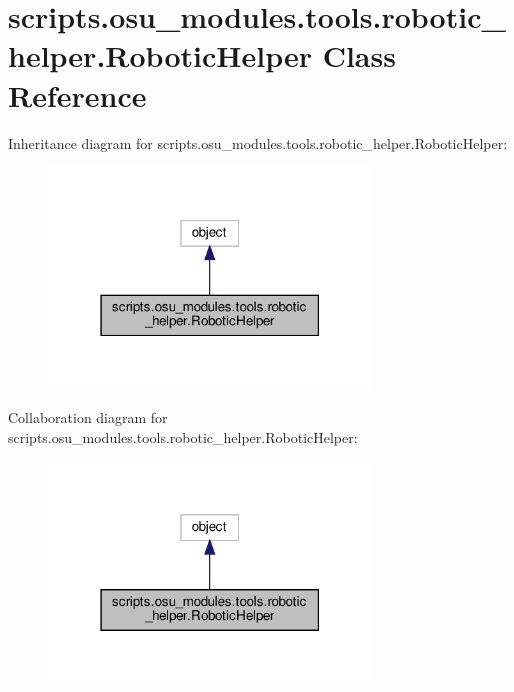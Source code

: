 \hypertarget{classscripts_1_1osu__modules_1_1tools_1_1robotic__helper_1_1RoboticHelper}{}\section{scripts.\+osu\+\_\+modules.\+tools.\+robotic\+\_\+helper.\+Robotic\+Helper Class Reference}
\label{classscripts_1_1osu__modules_1_1tools_1_1robotic__helper_1_1RoboticHelper}


Inheritance diagram for scripts.\+osu\+\_\+modules.\+tools.\+robotic\+\_\+helper.\+Robotic\+Helper\+:
\nopagebreak
\begin{figure}[H]
\begin{center}
\leavevmode
\includegraphics[width=243pt]{da/df5/classscripts_1_1osu__modules_1_1tools_1_1robotic__helper_1_1RoboticHelper__inherit__graph}
\end{center}
\end{figure}


Collaboration diagram for scripts.\+osu\+\_\+modules.\+tools.\+robotic\+\_\+helper.\+Robotic\+Helper\+:
\nopagebreak
\begin{figure}[H]
\begin{center}
\leavevmode
\includegraphics[width=243pt]{dc/dad/classscripts_1_1osu__modules_1_1tools_1_1robotic__helper_1_1RoboticHelper__coll__graph}
\end{center}
\end{figure}
